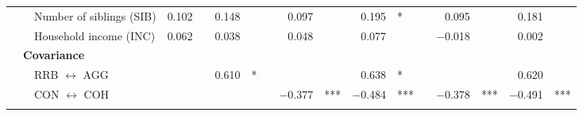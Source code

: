{\begin{tabular}{llll r@{\hskip -0.1mm}l r@{\hskip -0.1mm}l c r@{\hskip -0.1mm}l r@{\hskip -0.1mm}l c r@{\hskip -0.1mm}l r@{\hskip -0.1mm}l}
      &       & \multicolumn{2}{l}{Number of siblings (SIB)} & 0.102 &       & 0.148 &       &       & 0.097 &       & 0.195 & *     &       & 0.095 &       & 0.181 &  \\
      &       & \multicolumn{2}{l}{Household income (INC)} & 0.062 &       & 0.038 &       &       & 0.048 &       & 0.077 &       &       & $-$0.018 &       & 0.002 &  \\
      & \multicolumn{3}{l}{\textbf{Covariance}} &       &       &       &       &       &       &       &       &       &       &       &       &       &  \\
      &       & \multicolumn{2}{l}{RRB $\longleftrightarrow$ AGG} &       &       & 0.610 & *    &       &       &       & 0.638 & *    &       &       &       & 0.620 & \\
      &       & \multicolumn{2}{l}{CON $\longleftrightarrow$ COH} &       &       &       &       &       & $-$0.377 & ***   & $-$0.484 & ***   &       & $-$0.378 & ***   & $-$0.491 & *** \\
      & & \multicolumn{2}{l}{\phantom{of parental mental health (PHM)}} & \phantom{$-$10,110.014} & \phantom{***} & \phantom{$-$0.065} & \phantom{***} & & \phantom{$-$10,068.675} & \phantom{***} & \phantom{$-$0.418} & \phantom{***} & & \phantom{$-$10,329.913} & \phantom{***} & \phantom{$-$0.413} & \phantom{***}\\
      \bottomrule
      \end{tabular}
}
